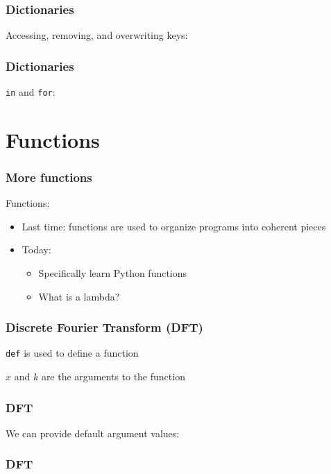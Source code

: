 \documentclass{beamer}
\begin{document}
\begin{frame}
\frametitle{Dictionaries}

Accessing, removing, and overwriting keys:


\end{frame}

\begin{frame}
\frametitle{Dictionaries}

\texttt{in} and \texttt{for}:


\end{frame}

\section{Functions}

\begin{frame}
\frametitle{More functions}

Functions:
\begin{itemize}
\setlength{\itemsep}{0.15in}
\item{Last time: functions are used to organize programs into coherent pieces}
\item{Today:
\begin{itemize}
  \setlength{\itemsep}{0.1in}
  \item{Specifically learn Python functions}
  \item{What is a lambda?}
\end{itemize}
}
\end{itemize}

\end{frame}

\begin{frame}
\frametitle{Discrete Fourier Transform (DFT)}
\texttt{def} is used to define a function


$x$ and $k$ are the arguments to the function
\end{frame}

\begin{frame}
\frametitle{DFT}

We can provide default argument values:


\end{frame}


\begin{frame}
\frametitle{DFT}


\end{frame}
\end{document}

